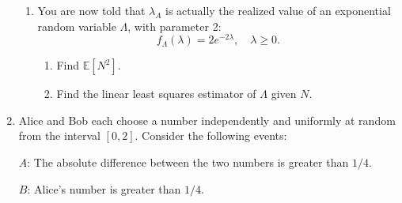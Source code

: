 \documentclass[a4paper,9pt,landscape]{extarticle}
\begin{document}
\begin{multicols*}{3}
\begin{enumerate}
\begin{enumerate}
		\item You are now told that $\lambda_A$ is actually the realized value of an exponential random variable $\Lambda$, with parameter 2:
		$$f_\Lambda(\lambda)=2e^{-2\lambda},\quad\lambda\geq0.$$
		\begin{enumerate}
			\item Find $\mathds{E}\left[N^2\right]$.
			\item Find the linear least squares estimator of $\Lambda$ given $N$.
		\end{enumerate}
	\end{enumerate}
	\item Alice and Bob each choose a number independently and uniformly at random from the interval $[0,2]$. Consider the following events:
	
	$A$: The absolute difference between the two numbers is greater than $1/4$.
	
	$B$: Alice's number is greater than $1/4$.
	

\end{enumerate}
\end{multicols*}
\end{document}
